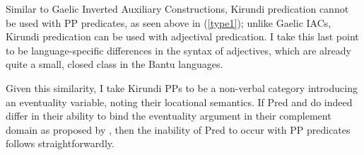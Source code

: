 \documentclass[12pt]{article}
\begin{document}
Similar to Gaelic Inverted Auxiliary Constructions, Kirundi  predication cannot be used with PP predicates, as seen above in (\ref{type1}); unlike Gaelic IACs, Kirundi  predication can be used with adjectival predication. I take this last point to be language-specific differences in the syntax of adjectives, which are already quite a small, closed class in the Bantu languages. 

\bex
\ex {}
\bxl
{}
\fxl
\fex

Given this similarity, I take Kirundi PPs to be a non-verbal category introducing an eventuality variable, noting their locational semantics. If Pred and  do indeed differ in their ability to bind the eventuality argument in their complement domain as proposed by \citet{adger-ramchand-2003}, then the inability of  Pred to occur with PP predicates follows straightforwardly. 


\end{document}
